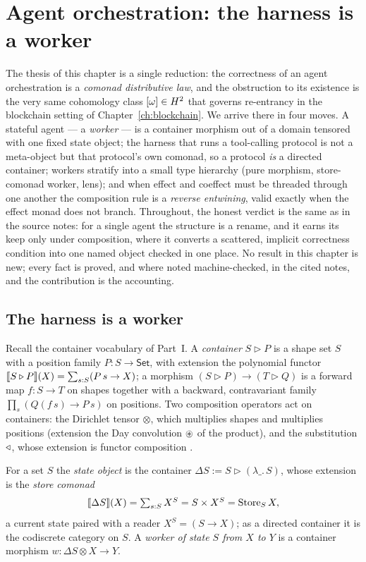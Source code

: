 \chapter{Agent orchestration: the harness is a worker}
\label{ch:orchestration}

The thesis of this chapter is a single reduction: the correctness of an agent
orchestration is a \emph{comonad distributive law}, and the obstruction to its existence is
the very same cohomology class $[\omega]\in H^2$ that governs re-entrancy in the blockchain
setting of Chapter~\ref{ch:blockchain}. We arrive there in four moves. A stateful agent --- a
\emph{worker} --- is a container morphism out of a domain tensored with one fixed state
object; the harness that runs a tool-calling protocol is not a meta-object but that
protocol's own comonad, so a protocol \emph{is} a directed container; workers stratify into a
small type hierarchy (pure morphism, store-comonad worker, lens); and when effect and coeffect
must be threaded through one another the composition rule is a \emph{reverse entwining}, valid
exactly when the effect monad does not branch. Throughout, the honest verdict is the same as in
the source notes: for a single agent the structure is a rename, and it earns its keep only under
composition, where it converts a scattered, implicit correctness condition into one named object
checked in one place. No result in this chapter is new; every fact is proved, and where noted
machine-checked, in the cited notes, and the contribution is the accounting.

\section{The harness is a worker}\label{sec:orch-harness}

Recall the container vocabulary of Part~I. A \emph{container} $S\triangleright P$ is a shape set
$S$ with a position family $P:S\to\mathsf{Set}$, with extension the polynomial functor
$\llbracket S\triangleright P \rrbracket(X)=\sum_{s:S}(P\,s\to X)$; a morphism $(S\triangleright P)\to(T\triangleright
Q)$ is a forward map $f:S\to T$ on shapes together with a backward, contravariant family
$\prod_{s}(Q(f\,s)\to P\,s)$ on positions. Two composition operators act on containers: the
Dirichlet tensor $\otimes$, which multiplies shapes and multiplies positions (extension the
Day convolution $\circledast$ of the product), and the substitution $\triangleleft$, whose extension is
functor composition \cite{Spi21,SS23}.

\begin{definition}\label{def:orch-worker}
For a set $S$ the \emph{state object} is the container $\Delta S:=S\triangleright(\lambda\_.\,S)$,
whose extension is the \emph{store comonad}
\[
  \llbracket \Delta S \rrbracket(X)=\textstyle\sum_{s:S}X^{S}=S\times X^{S}=\mathrm{Store}_S\,X,
\]
a current state paired with a reader $X^S=(S\to X)$; as a directed container it is the
codiscrete category on $S$. A \emph{worker of state $S$ from $X$ to $Y$} is a container morphism
$w:\Delta S\otimes X\to Y$.
\end{definition}

